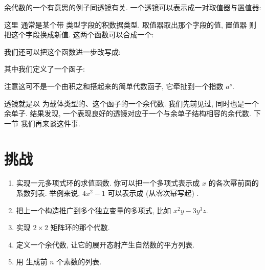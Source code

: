 余代数的一个有意思的例子同透镜有关. 一个透镜可以表示成一对取值器与置值器:

这里  通常是某个带  类型字段的积数据类型. 取值器取出那个字段的值, 置值器
则把这个字段换成新值. 这两个函数可以合成一个:

我们还可以把这个函数进一步改写成:

其中我们定义了一个函子:

注意这可不是一个由积之和搭起来的简单代数函子, 它牵扯到一个指数 $a^s$.

透镜就是以  为载体类型的、这个函子的一个余代数. 我们先前见过, 
同时也是一个余单子. 结果发现, 一个表现良好的透镜对应于一个与余单子结构相容的余代数. 下一节
我们再来谈这件事.

\section{挑战}

\begin{enumerate}
  \tightlist
  \item
        实现一元多项式环的求值函数. 你可以把一个多项式表示成 $x$ 的各次幂前面的系数列表.
        举例来说, $4x^2-1$ 可以表示成 (从零次幂写起) \code{{[}-1, 0, 4{]}}.
  \item
        把上一个构造推广到多个独立变量的多项式, 比如 $x^2y-3y^3z$.
  \item
        实现 $2\times{}2$ 矩阵环的那个代数.
  \item
        定义一个余代数, 让它的展开态射产生自然数的平方列表.
  \item
        用  生成前 $n$ 个素数的列表.
\end{enumerate}
